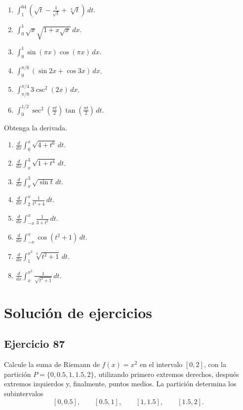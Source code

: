\documentclass[12pt]{article}
\begin{document}
\begin{enumerate}
\item $\displaystyle \int_1^{64}\left(\sqrt t-\frac1{\sqrt t}+\sqrt[3]t\right)\,dt$.
\item $\displaystyle \int_0^1\sqrt{x}\sqrt{1+x\sqrt{x}}\,dx$.
\item $\displaystyle \int_0^1\sin(\pi x)\cos(\pi x)\,dx$.
\item $\displaystyle \int_0^{\pi/6}(\sin2x+\cos3x)\,dx$.
\item $\displaystyle \int_{\pi/8}^{\pi/4}3\csc^2(2x)\,dx$.
\item $\displaystyle \int_0^{1/2}\sec^2\left(\frac{\pi t}{2}\right)\tan\left(\frac{\pi t}{2}\right)\,dt$.
\end{enumerate}

Obtenga la derivada.

\begin{enumerate}
\item $\displaystyle \frac{d}{dx}\int_0^x\sqrt{4+t^6}\,dt$.
\item $\displaystyle \frac{d}{dx}\int_x^3\sqrt{1+t^4}\,dt$.
\item $\displaystyle \frac{d}{dx}\int_x^3\sqrt{\sin t}\,dt$.
\item $\displaystyle \frac{d}{dx}\int_2^x\frac1{t^4+4}\,dt$.
\item $\displaystyle \frac{d}{dx}\int_{-x}^{x}\frac1{3+t^2}\,dt$.
\item $\displaystyle \frac{d}{dx}\int_{-x}^{x}\cos(t^2+1)\,dt$.
\item $\displaystyle \frac{d}{dx}\int_1^{x^3}\sqrt[3]{t^2+1}\,dt$.
\item $\displaystyle \frac{d}{dx}\int_x^{x^2}\frac1{\sqrt{t^2+1}}\,dt$.
\end{enumerate}

\newpage
\section{Solución de ejercicios}
\subsection*{Ejercicio 87}
Calcule la suma de Riemann de $f(x)=x^2$ en el intervalo $[0,2]$, con la partición $P=\{0,0.5,1,1.5,2\}$, utilizando primero extremos derechos, después extremos izquierdos y, finalmente, puntos medios. La partición determina los subintervalos
\[
[0,0.5],\qquad
[0.5,1],\qquad
[1,1.5],\qquad
[1.5,2].
\]
\end{document}
